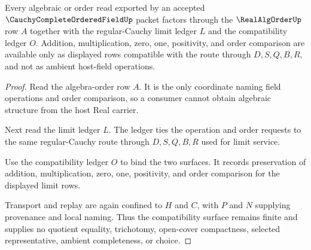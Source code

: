 \begin{theorem}
\label{thm:cauchy-complete-ordered-field-order-algebra-compatibility}
Every algebraic or order read exported by an accepted $\CauchyCompleteOrderedFieldUp$ packet factors through the $\RealAlgOrderUp$ row $A$ together with the regular-Cauchy limit ledger $L$ and the compatibility ledger $O$. Addition, multiplication, zero, one, positivity, and order comparison are available only as displayed rows compatible with the route through $D,S,Q,B,R$, and not as ambient host-field operations.
\end{theorem}
\begin{proof}
Read the algebra-order row $A$. It is the only coordinate naming field operations and order comparison, so a consumer cannot obtain algebraic structure from the host Real carrier.

Next read the limit ledger $L$. The ledger ties the operation and order requests to the same regular-Cauchy route through $D,S,Q,B,R$ used for limit service.

Use the compatibility ledger $O$ to bind the two surfaces. It records preservation of addition, multiplication, zero, one, positivity, and order comparison for the displayed limit rows.

Transport and replay are again confined to $H$ and $C$, with $P$ and $N$ supplying provenance and local naming. Thus the compatibility surface remains finite and supplies no quotient equality, trichotomy, open-cover compactness, selected representative, ambient completeness, or choice.
\end{proof}

